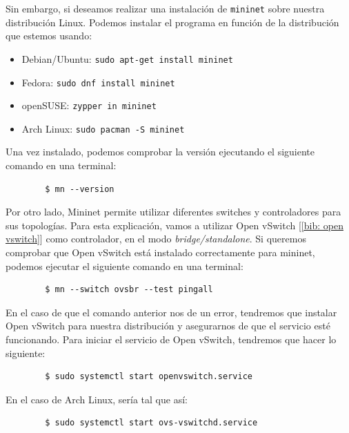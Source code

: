 \documentclass[a4paper, oneside, 12pt]{book}
\begin{document}
	 \noindent Sin embargo, si deseamos realizar una instalación de \texttt{mininet} sobre nuestra distribución Linux. Podemos instalar el programa en función de la distribución que estemos usando:
	
	\begin{itemize}
		\item Debian/Ubuntu: \texttt{sudo apt-get install mininet}
		\item Fedora: \texttt{sudo dnf install mininet}
		\item openSUSE: \texttt{zypper in mininet}
		\item Arch Linux: \texttt{sudo pacman -S mininet}
	\end{itemize}

	\noindent Una vez instalado, podemos comprobar la versión ejecutando el siguiente comando en una terminal:
	\begin{verbatim}
		$ mn --version
	\end{verbatim}

	\noindent Por otro lado, Mininet permite utilizar diferentes switches y controladores para sus topologías. Para esta explicación, vamos a utilizar Open vSwitch [\ref{bib: open vswitch}] como controlador, en el modo \textit{bridge/standalone}. Si queremos comprobar que Open vSwitch está instalado correctamente para mininet, podemos ejecutar el siguiente comando en una terminal:
	\begin{verbatim}
		$ mn --switch ovsbr --test pingall
	\end{verbatim}

	\noindent En el caso de que el comando anterior nos de un error, tendremos que instalar Open vSwitch para nuestra distribución y asegurarnos de que el servicio esté funcionando. Para iniciar el servicio de Open vSwitch, tendremos que hacer lo siguiente:
	\begin{verbatim}
		$ sudo systemctl start openvswitch.service
	\end{verbatim}

	\noindent En el caso de Arch Linux, sería tal que así:
	\begin{verbatim}
		$ sudo systemctl start ovs-vswitchd.service
	\end{verbatim}

	
	\pagebreak
	
\end{document}
